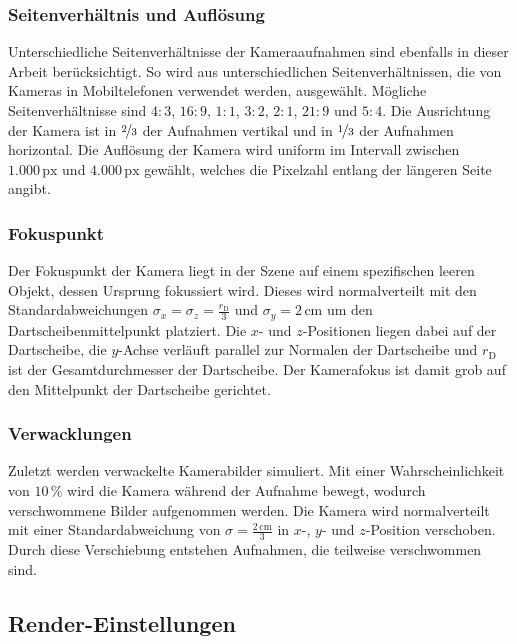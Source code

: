 \subsubsection{Seitenverhältnis und Auflösung}
\label{sec:aufloesung}

Unterschiedliche Seitenverhältnisse der Kameraaufnahmen sind ebenfalls in dieser Arbeit berücksichtigt. So wird aus unterschiedlichen Seitenverhältnissen, die von Kameras in Mobiltelefonen verwendet werden, ausgewählt. Mögliche Seitenverhältnisse sind $4\!:\!3$, $16\!:\!9$, $1\!:\!1$, $3\!:\!2$, $2\!:\!1$, $21\!:\!9$ und $5\!:\!4$. Die Ausrichtung der Kamera ist in $\nicefrac{2}{3}$ der Aufnahmen vertikal und in $\nicefrac{1}{3}$ der Aufnahmen horizontal. Die Auflösung der Kamera wird uniform im Intervall zwischen $1.000\,\text{px}$ und  $4.000\,\text{px}$ gewählt, welches die Pixelzahl entlang der längeren Seite angibt.

\subsubsection{Fokuspunkt}
\label{sec:fokus}

Der Fokuspunkt der Kamera liegt in der Szene auf einem spezifischen leeren Objekt, dessen Ursprung fokussiert wird. Dieses wird normalverteilt mit den Standardabweichungen $\sigma_x = \sigma_z = \frac{r_\text{D}}{3}$ und $\sigma_y = 2\,\text{cm}$ um den Dartscheibenmittelpunkt platziert. Die $x$- und $z$-Positionen liegen dabei auf der Dartscheibe, die $y$-Achse verläuft parallel zur Normalen der Dartscheibe und $r_\text{D}$ ist der Gesamtdurchmesser der Dartscheibe. Der Kamerafokus ist damit grob auf den Mittelpunkt der Dartscheibe gerichtet.

\subsubsection{Verwacklungen}
\label{sec:motion_blur}

Zuletzt werden verwackelte Kamerabilder simuliert. Mit einer Wahrscheinlichkeit von $10\,\%$ wird die Kamera während der Aufnahme bewegt, wodurch verschwommene Bilder aufgenommen werden. Die Kamera wird normalverteilt mit einer Standardabweichung von $\sigma = \frac{2\,\text{cm}}{3}$ in $x$-, $y$- und $z$-Position verschoben. Durch diese Verschiebung entstehen Aufnahmen, die teilweise verschwommen sind.

\subsection{Render-Einstellungen}  %
\label{sec:render_einstellungen}

